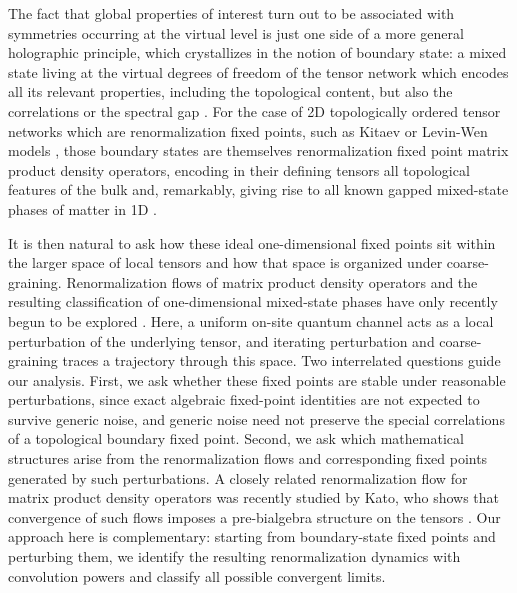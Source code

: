 \documentclass[a4paper,10pt]{amsart}
\theoremstyle{definition}
\begin{document}
The fact that global properties of interest turn out to be associated with symmetries occurring at the virtual level is just one side of a more general holographic principle, which crystallizes in the notion of boundary state: a mixed state living at the virtual degrees of freedom of the tensor network which encodes all its relevant properties, including the topological content, but also the correlations or the spectral gap \cite{cirac_matrix_2017, cirac2011entanglement, kastoryano2019locality, ruiz_matrix_2024}. For the case of 2D topologically ordered tensor networks which are renormalization fixed points, such as Kitaev or Levin-Wen models \cite{kitaev_fault-tolerant_2003, levin_string-net_2005}, those boundary states are themselves renormalization fixed point matrix product density operators, encoding in their defining tensors all topological features of the bulk and, remarkably, giving rise to all known gapped mixed-state phases of matter in 1D \cite{sun_anomalous_2025}.


It is then natural to ask how these ideal one-dimensional fixed points sit within the larger space of local tensors and how that space is organized under coarse-graining.
Renormalization flows of matrix product density operators and the resulting classification of one-dimensional mixed-state phases have only recently begun to be explored \cite{cirac_matrix_2017,ruiz_matrix_2024,coser_classification_2019,sun_anomalous_2025,liu_trading_2025,liu_establishing_2026}. 
Here, a uniform on-site quantum channel acts as a local perturbation of the underlying tensor, and iterating perturbation and coarse-graining traces a trajectory through this space.
Two interrelated questions guide our analysis.
First, we ask whether these fixed points are stable under reasonable perturbations, since exact algebraic fixed-point identities are not expected to survive generic noise, and generic noise need not preserve the special correlations of a topological boundary fixed point.
Second, we ask which mathematical structures arise from the renormalization flows and corresponding fixed points generated by such perturbations.
A closely related renormalization flow for matrix product density operators was recently studied by Kato, who shows that convergence of such flows imposes a pre-bialgebra structure on the tensors \cite{kato_exact_2024}.
Our approach here is complementary: starting from boundary-state fixed points and perturbing them, we identify the resulting renormalization dynamics with convolution powers and classify all possible convergent limits.
\end{document}
